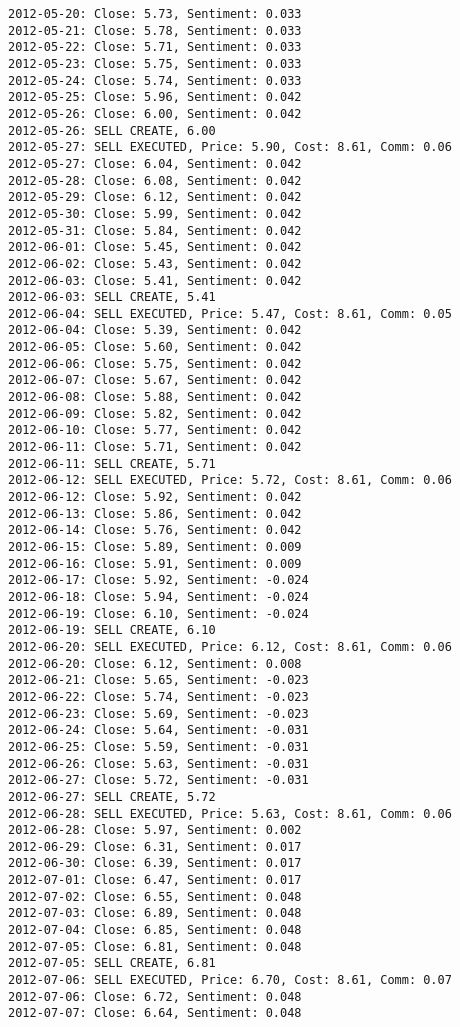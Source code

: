 \documentclass[11pt]{article}
\begin{document}
\begin{Verbatim}[commandchars=\\\{\}]
2012-05-20: Close: 5.73, Sentiment: 0.033
2012-05-21: Close: 5.78, Sentiment: 0.033
2012-05-22: Close: 5.71, Sentiment: 0.033
2012-05-23: Close: 5.75, Sentiment: 0.033
2012-05-24: Close: 5.74, Sentiment: 0.033
2012-05-25: Close: 5.96, Sentiment: 0.042
2012-05-26: Close: 6.00, Sentiment: 0.042
2012-05-26: SELL CREATE, 6.00
2012-05-27: SELL EXECUTED, Price: 5.90, Cost: 8.61, Comm: 0.06
2012-05-27: Close: 6.04, Sentiment: 0.042
2012-05-28: Close: 6.08, Sentiment: 0.042
2012-05-29: Close: 6.12, Sentiment: 0.042
2012-05-30: Close: 5.99, Sentiment: 0.042
2012-05-31: Close: 5.84, Sentiment: 0.042
2012-06-01: Close: 5.45, Sentiment: 0.042
2012-06-02: Close: 5.43, Sentiment: 0.042
2012-06-03: Close: 5.41, Sentiment: 0.042
2012-06-03: SELL CREATE, 5.41
2012-06-04: SELL EXECUTED, Price: 5.47, Cost: 8.61, Comm: 0.05
2012-06-04: Close: 5.39, Sentiment: 0.042
2012-06-05: Close: 5.60, Sentiment: 0.042
2012-06-06: Close: 5.75, Sentiment: 0.042
2012-06-07: Close: 5.67, Sentiment: 0.042
2012-06-08: Close: 5.88, Sentiment: 0.042
2012-06-09: Close: 5.82, Sentiment: 0.042
2012-06-10: Close: 5.77, Sentiment: 0.042
2012-06-11: Close: 5.71, Sentiment: 0.042
2012-06-11: SELL CREATE, 5.71
2012-06-12: SELL EXECUTED, Price: 5.72, Cost: 8.61, Comm: 0.06
2012-06-12: Close: 5.92, Sentiment: 0.042
2012-06-13: Close: 5.86, Sentiment: 0.042
2012-06-14: Close: 5.76, Sentiment: 0.042
2012-06-15: Close: 5.89, Sentiment: 0.009
2012-06-16: Close: 5.91, Sentiment: 0.009
2012-06-17: Close: 5.92, Sentiment: -0.024
2012-06-18: Close: 5.94, Sentiment: -0.024
2012-06-19: Close: 6.10, Sentiment: -0.024
2012-06-19: SELL CREATE, 6.10
2012-06-20: SELL EXECUTED, Price: 6.12, Cost: 8.61, Comm: 0.06
2012-06-20: Close: 6.12, Sentiment: 0.008
2012-06-21: Close: 5.65, Sentiment: -0.023
2012-06-22: Close: 5.74, Sentiment: -0.023
2012-06-23: Close: 5.69, Sentiment: -0.023
2012-06-24: Close: 5.64, Sentiment: -0.031
2012-06-25: Close: 5.59, Sentiment: -0.031
2012-06-26: Close: 5.63, Sentiment: -0.031
2012-06-27: Close: 5.72, Sentiment: -0.031
2012-06-27: SELL CREATE, 5.72
2012-06-28: SELL EXECUTED, Price: 5.63, Cost: 8.61, Comm: 0.06
2012-06-28: Close: 5.97, Sentiment: 0.002
2012-06-29: Close: 6.31, Sentiment: 0.017
2012-06-30: Close: 6.39, Sentiment: 0.017
2012-07-01: Close: 6.47, Sentiment: 0.017
2012-07-02: Close: 6.55, Sentiment: 0.048
2012-07-03: Close: 6.89, Sentiment: 0.048
2012-07-04: Close: 6.85, Sentiment: 0.048
2012-07-05: Close: 6.81, Sentiment: 0.048
2012-07-05: SELL CREATE, 6.81
2012-07-06: SELL EXECUTED, Price: 6.70, Cost: 8.61, Comm: 0.07
2012-07-06: Close: 6.72, Sentiment: 0.048
2012-07-07: Close: 6.64, Sentiment: 0.048

\end{Verbatim}
\end{document}
